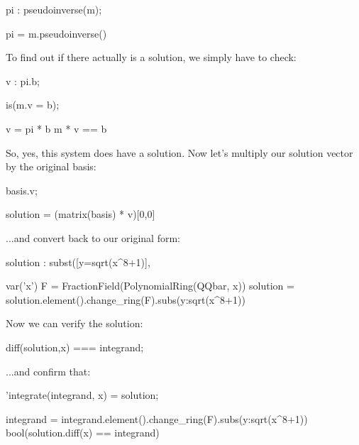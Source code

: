 \begin{maximablock}
pi : pseudoinverse(m);
\end{maximablock}

\begin{sageblock}[riemannroch3]
pi = m.pseudoinverse()
\end{sageblock}

To find out if there actually is a solution, we simply have to check:

\begin{maximablock}
v : pi.b;

is(m.v = b);
\end{maximablock}

\begin{sageblock}[riemannroch3]
v = pi * b
m * v == b
\end{sageblock}

So, yes, this system does have a solution.  Now let's multiply our
solution vector by the original basis:

\begin{maximablock}
basis.v;
\end{maximablock}

\begin{sageblock}[riemannroch3]
solution = (matrix(basis) * v)[0,0]
\end{sageblock}

...and convert back to our original form:

\begin{maximablock}
solution : subst([y=sqrt(x^8+1)], %
\end{maximablock}

\begin{sageblock}[riemannroch3]
var('x')
F = FractionField(PolynomialRing(QQbar, x))
solution = solution.element().change_ring(F).subs({y:sqrt(x^8+1)})
\end{sageblock}

Now we can verify the solution:

\begin{maximablock}
diff(solution,x) === integrand;
\end{maximablock}

...and confirm that:

\begin{maximablock}
'integrate(integrand, x) = solution;
\end{maximablock}

\begin{sageblock}[riemannroch3]
integrand = integrand.element().change_ring(F).subs({y:sqrt(x^8+1)})
bool(solution.diff(x) == integrand)
\end{sageblock}

